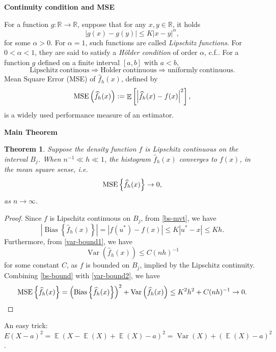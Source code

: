 \documentclass[19pt,landscaoe]{article}
\newtheorem{thm}{Theorem}%
\DeclareMathOperator{\E}{\mathbb{E}}
\newcommand{\R}{\mathbb{R}}
\DeclareMathOperator{\Var}{\mathrm{Var}}
\DeclareMathOperator{\var}{\mathrm{Var}}
\DeclareMathOperator{\bs}{\mathrm{Bias}}
\begin{document}
\newpage
{\LARGE\centerline{\textbf{Continuity condition and MSE}}}
\vskip25pt
\begin{minipage}{.9\textwidth}
    \Large
        For a function $g:\R\to\R$, suppose that for any $x,y\in\R$, it holds 
        \begin{equation}
            |g(x)-g(y)|\le K|x-y|^\alpha,
        \end{equation}
        for some $\alpha>0$. 
        For $\alpha=1$, such functions are called {\it Lipschitz functions}. For $0<\alpha<1$, they are said to satisfy a {\it H\"older condition} of order $\alpha$, c.f.\cite[Page~56]{Dudley02}. 
\vskip 5pt
        For a function $g$ defined on a finite interval $[a,b]$ with $a<b$, 
        $$\mathrm{Lipschitz~continous}\Rightarrow \mathrm{H\ddot{o}lder~continuous}\Rightarrow \mathrm{uniformly~continuous}.$$
Mean Square Error (MSE) of $\widehat{f}_h(x)$, defined by 
\begin{eqnarray}
    {\rm MSE}\left(\widehat{f}_h(x)\right):=\E\left[\left|\widehat{f}_h(x)-f(x)\right|^2\right],
\end{eqnarray}
is a widely used performance measure of an estimator. 
\end{minipage}

\newpage
{\LARGE\centerline{\textbf{Main Theorem}}}
\vskip25pt
\begin{minipage}{.9\textwidth}
    \large
\begin{thm}\label{thm1-L2}
    Suppose the density function $f$ is Lipschitz continuous on the interval $B_j$. When $n^{-1}\ll h\ll1$, the histogram $\widehat{f}_h(x)$ converges to $f(x)$, in the mean square sense,  i.e. 
    \begin{equation}
        {\rm MSE}\left\{\widehat{f}_h(x)\right\}\to0,
    \end{equation}
    as $n\to\infty$.
\end{thm}
\begin{proof}
    Since $f$ is Lipschitz continuous on $B_j$, from \eqref{bs-mvt}, we have
    \begin{equation}\label{bs-bound}
        \left|\bs\left\{\widehat{f}_h(x)\right\}\right|=\left|f(u^*)-f(x)\right|\le K|u^*-x|\le Kh.
    \end{equation}
    Furthermore, from \eqref{var-bound1}, we have 
    \begin{equation}\label{var-bound2}
        \var\left(\widehat{f}_h(x)\right)\le C(nh)^{-1}
    \end{equation} for some constant $C$, 
    as $f$ is bounded on $B_j$, implied by the Lipschitz continuity. Combining \eqref{bs-bound} with \eqref{var-bound2}, we have
    \begin{equation} \label{bound-mse1}
        {\rm MSE}\left\{\widehat{f}_h(x)\right\} =\left(\bs\left\{\widehat{f}_h(x)\right\}\right)^2+\var\left(\widehat{f}_h(x)\right)\le K^2h^2+C(nh)^{-1}\to0.
    \end{equation}
\end{proof}
{\small An easy trick: $E(X-a)^2=\E(X-\E(X)+\E(X)-a)^2=\Var(X)+(\E(X)-a)^2$.}
\end{minipage}
\end{document}
